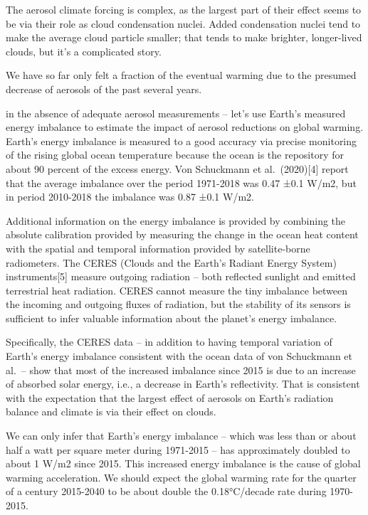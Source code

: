 \documentclass[
]{book}
\begin{document}
The aerosol climate forcing is complex, as the largest part of their effect seems to be via their role as cloud condensation nuclei. Added condensation nuclei tend to make the average cloud particle smaller; that tends to make brighter, longer-lived clouds, but it's a complicated story.

We have so far only felt a fraction of the eventual warming due to the presumed decrease of aerosols of the past several years.

in the absence of adequate aerosol measurements -- let's use Earth's measured energy imbalance to estimate the impact of aerosol reductions on global warming. Earth's energy imbalance is measured to a good accuracy via precise monitoring of the rising global ocean temperature because the ocean is the repository for about 90 percent of the excess energy. Von Schuckmann et al.~(2020){[}4{]} report that the average imbalance over the period 1971-2018 was 0.47 ±0.1 W/m2, but in period 2010-2018 the imbalance was 0.87 ±0.1 W/m2.

Additional information on the energy imbalance is provided by combining the absolute calibration provided by measuring the change in the ocean heat content with the spatial and temporal information provided by satellite-borne radiometers. The CERES (Clouds and the Earth's Radiant Energy System) instruments{[}5{]} measure outgoing radiation -- both reflected sunlight and emitted terrestrial heat radiation. CERES cannot measure the tiny imbalance between the incoming and outgoing fluxes of radiation, but the stability of its sensors is sufficient to infer valuable information about the planet's energy imbalance.

Specifically, the CERES data -- in addition to having temporal variation of Earth's energy imbalance consistent with the ocean data of von Schuckmann et al.~-- show that most of the increased imbalance since 2015 is due to an increase of absorbed solar energy, i.e., a decrease in Earth's reflectivity. That is consistent with the expectation that the largest effect of aerosols on Earth's radiation balance and climate is via their effect on clouds.

We can only infer that Earth's energy imbalance -- which was less than or about half a watt per square meter during 1971-2015 -- has approximately doubled to about 1 W/m2 since 2015. This increased energy imbalance is the cause of global warming acceleration. We should expect the global warming rate for the quarter of a century 2015-2040 to be about double the 0.18°C/decade rate during 1970-2015.
\end{document}
